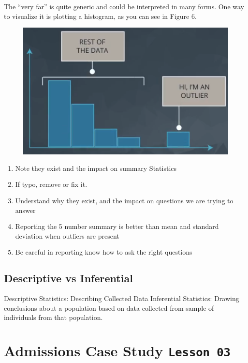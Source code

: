 \documentclass[]{book}
\providecommand{\tightlist}{%
  \setlength{\itemsep}{0pt}\setlength{\parskip}{0pt}}
\begin{document}
The ``very far'' is quite generic and could be interpreted in many
forms. One way to visualize it is plotting a histogram, as you can see
in Figure 6.

\begin{figure}
\centering
\includegraphics{01-img/c4_l2_06.png}
\caption{}
\end{figure}

\begin{enumerate}
\def\labelenumi{\arabic{enumi}.}
\tightlist
\item
  Note they exist and the impact on summary Statistics
\item
  If typo, remove or fix it.
\item
  Understand why they exist, and the impact on questions we are trying
  to answer
\item
  Reporting the 5 number summary is better than mean and standard
  deviation when outliers are present
\item
  Be careful in reporting know how to ask the right questions
\end{enumerate}

\subsection{Descriptive vs
Inferential}\label{descriptive-vs-inferential}

Descriptive Statistics: Describing Collected Data Inferential
Statistics: Drawing conclusions about a population based on data
collected from sample of individuals from that population.

\section{\texorpdfstring{Admissions Case Study
\texttt{Lesson\ 03}}{Admissions Case Study Lesson 03}}\label{admissions-case-study-lesson-03}
\end{document}
